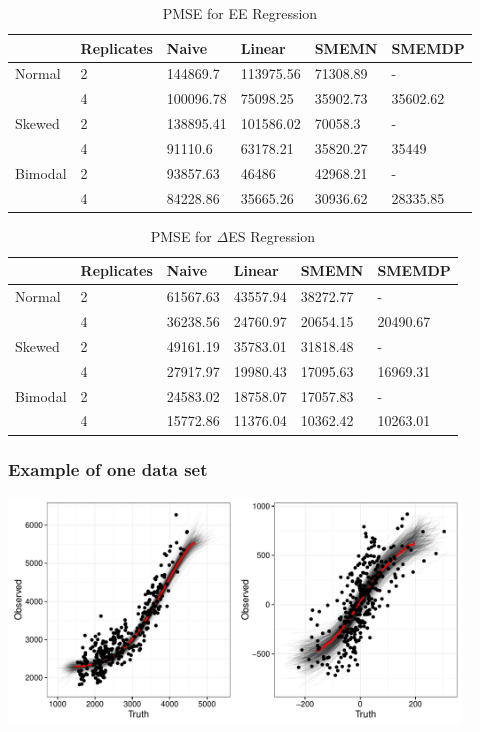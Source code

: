 \documentclass[handout]{beamer}\usepackage[]{graphicx}\usepackage[]{color}
\begin{document}
\begin{frame}

\begin{table}[ht]
\centering
\begin{tabular}{ll|llll}
  \hline
 & Replicates & Naive & Linear & SMEMN & SMEMDP \\ 
  \hline
Normal & 2 & 144869.7 & 113975.56 & 71308.89 & - \\ 
   & 4 & 100096.78 & 75098.25 & 35902.73 & 35602.62 \\ 
  Skewed & 2 & 138895.41 & 101586.02 & 70058.3 & - \\ 
   & 4 & 91110.6 & 63178.21 & 35820.27 & 35449 \\ 
  Bimodal & 2 & 93857.63 & 46486 & 42968.21 & - \\ 
   & 4 & 84228.86 & 35665.26 & 30936.62 & 28335.85 \\ 
   \hline
\end{tabular}
\caption{PMSE for EE Regression} 
\label{pmseee}
\end{table}





\begin{table}[ht]
\centering
\begin{tabular}{ll|llll}
  \hline
 & Replicates & Naive & Linear & SMEMN & SMEMDP \\ 
  \hline
Normal & 2 & 61567.63 & 43557.94 & 38272.77 & - \\ 
   & 4 & 36238.56 & 24760.97 & 20654.15 & 20490.67 \\ 
  Skewed & 2 & 49161.19 & 35783.01 & 31818.48 & - \\ 
   & 4 & 27917.97 & 19980.43 & 17095.63 & 16969.31 \\ 
  Bimodal & 2 & 24583.02 & 18758.07 & 17057.83 & - \\ 
   & 4 & 15772.86 & 11376.04 & 10362.42 & 10263.01 \\ 
   \hline
\end{tabular}
\caption{PMSE for $\Delta$ES Regression} 
\label{pmsees}
\end{table}



\end{frame}


\begin{frame}
\frametitle{Example of one data set}
  \includegraphics[width=12cm,height=6cm]{predbvnsx.pdf}

\end{frame}
\end{document}

